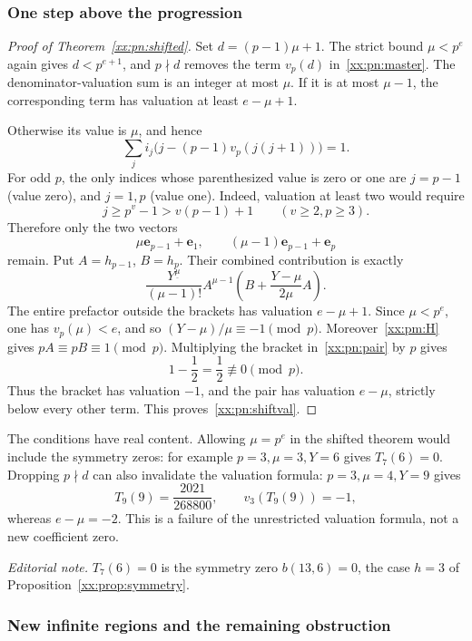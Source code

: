 \documentclass[11pt,a4paper]{article}
\numberwithin{equation}{section}
\theoremstyle{definition}
\theoremstyle{remark}
\theoremstyle{plain}
\newcommand{\fall}[2]{#1^{\underline{#2}}}
\begin{document}
\subsubsection{One step above the progression}

\begin{proof}[Proof of Theorem~\ref{xx:pn:shifted}]
Set $d=(p-1)\mu+1$. The strict bound $\mu<p^e$ again gives $d<p^{e+1}$, and
$p\nmid d$ removes the term $v_p(d)$ in~\eqref{xx:pn:master}. The
denominator-valuation sum is an integer at most $\mu$. If it is at most
$\mu-1$, the corresponding term has valuation at least $e-\mu+1$.

Otherwise its value is $\mu$, and hence
\[
 \sum_ji_j\bigl(j-(p-1)v_p(j(j+1))\bigr)=1.
\]
For odd $p$, the only indices whose parenthesized value is zero or one are
$j=p-1$ (value zero), and $j=1,p$ (value one). Indeed, valuation at least two
would require
\[
 j\ge p^v-1>v(p-1)+1\qquad(v\ge2,p\ge3).
\]
Therefore only the two vectors
\[
 \mu\mathbf e_{p-1}+\mathbf e_1,\qquad (\mu-1)\mathbf e_{p-1}+\mathbf e_p
\]
remain. Put $A=h_{p-1}$, $B=h_p$. Their combined contribution is exactly
\begin{equation}\label{xx:pn:pair}
 \frac{\fall Y\mu}{(\mu-1)!}A^{\mu-1}
       \left(B+\frac{Y-\mu}{2\mu}A\right).
\end{equation}
The entire prefactor outside the brackets has valuation $e-\mu+1$. Since
$\mu<p^e$, one has $v_p(\mu)<e$, and so $(Y-\mu)/\mu\equiv-1\pmod p$.
Moreover~\eqref{xx:pm:H} gives $pA\equiv pB\equiv1\pmod p$. Multiplying the
bracket in~\eqref{xx:pn:pair} by $p$ gives
\[
 1-\frac12=\frac12\not\equiv0\pmod p.
\]
Thus the bracket has valuation $-1$, and the pair has valuation $e-\mu$,
strictly below every other term. This proves~\eqref{xx:pn:shiftval}.
\end{proof}

The conditions have real content. Allowing $\mu=p^e$ in the shifted theorem
would include the symmetry zeros: for example $p=3,\mu=3,Y=6$ gives
$T_7(6)=0$. Dropping $p\nmid d$ can also invalidate the valuation formula:
$p=3,\mu=4,Y=9$ gives
\[
 T_9(9)=\frac{2021}{268800},\qquad v_3(T_9(9))=-1,
\]
whereas $e-\mu=-2$. This is a failure of the unrestricted valuation formula, not
a new coefficient zero.

\emph{Editorial note.}  $T_7(6)=0$ is the symmetry zero $b(13,6)=0$, the case
$h=3$ of Proposition~\ref{xx:prop:symmetry}.

\subsubsection{New infinite regions and the remaining obstruction}
\end{document}

